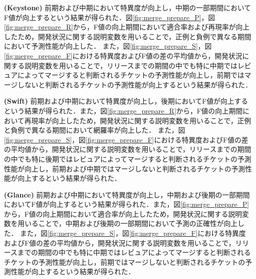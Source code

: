 \documentclass[11pt]{jreport}
\begin{document}
\textbf{ (Keystone) }前期および中期において特異度が向上し，中期の一部期間においてF値が向上するという結果が得られた．図\ref{fig:merge_prepare_P}，図\ref{fig:merge_prepare_R}から，F値の向上期間において適合率および再現率が向上したため，開発状況に関する説明変数を用いることで，正例と負例で異なる期間において予測性能が向上した．
また，図\ref{fig:merge_prepare_S}，図\ref{fig:merge_prepare_F}における特異度およびF値の差の平均値から，開発状況に関する説明変数を用いることで，リリースまでの期間の中でも特に中期ではレビュアによってマージすると判断されるチケットの予測性能が向上し，前期ではマージしないと判断されるチケットの予測性能が向上するという結果が得られた．

\textbf{ (Swift) }前期および中期において特異度が向上し，後期においてF値が向上するという結果が得られた．また，図\ref{fig:merge_prepare_R}から，F値の向上期間において再現率が向上したため，開発状況に関する説明変数を用いることで，正例と負例で異なる期間において網羅率が向上した．
また，図\ref{fig:merge_prepare_S}，図\ref{fig:merge_prepare_F}における特異度およびF値の差の平均値から，開発状況に関する説明変数を用いることで，リリースまでの期間の中でも特に後期ではレビュアによってマージすると判断されるチケットの予測性能が向上し，前期および中期ではマージしないと判断されるチケットの予測性能が向上するという結果が得られた．

\textbf{ (Glance) }前期および中期において特異度が向上し，中期および後期の一部期間においてF値が向上するという結果が得られた．また，図\ref{fig:merge_prepare_P}から，F値の向上期間において適合率が向上したため，開発状況に関する説明変数を用いることで，中期および後期の一部期間において予測の正確性が向上した．
また，図\ref{fig:merge_prepare_S}，図\ref{fig:merge_prepare_F}における特異度およびF値の差の平均値から，開発状況に関する説明変数を用いることで，リリースまでの期間の中でも特に中期ではレビュアによってマージすると判断されるチケットの予測性能が向上し，前期ではマージしないと判断されるチケットの予測性能が向上するという結果が得られた．
\end{document}

